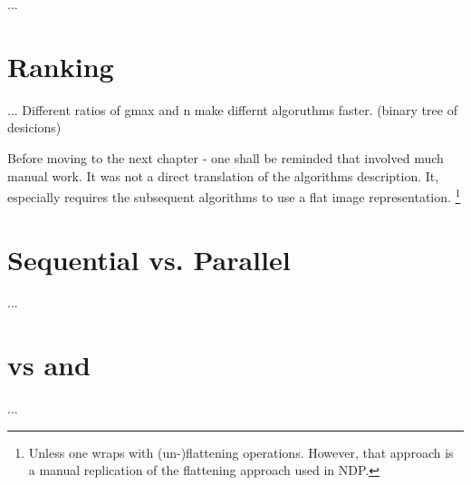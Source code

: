 


...

\section{Ranking}
  ...
  Different ratios of gmax and n make differnt algoruthms faster. (binary tree of desicions)
  
  
  Before moving to the next chapter - one shall be reminded that
  \man involved much manual work. It was not a direct translation
  of the algorithms description. It, especially requires
  the subsequent algorithms to use a flat image representation.
  \footnote{Unless one wraps \man with (un-)flattening operations.
  However, that approach is a manual replication of the
  flattening approach used in NDP.}
  
\section{Sequential vs. Parallel}
  ...
\section{\man vs \ndpn and \ndpv}
  ...
  
